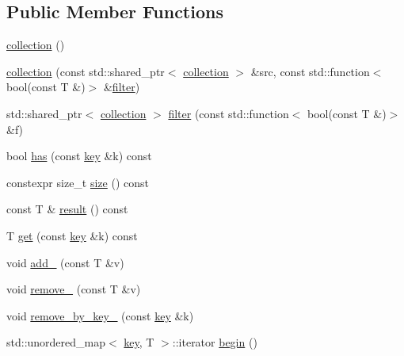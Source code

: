 \subsection*{Public Member Functions}
\begin{DoxyCompactItemize}
\item 
\hyperlink{classtelegraph_1_1collection_a226e589bb9d07937a82843f5da0610a0}{collection} ()
\item 
\hyperlink{classtelegraph_1_1collection_a4ce0e224a982a6025015a1ef7008ca56}{collection} (const std\+::shared\+\_\+ptr$<$ \hyperlink{classtelegraph_1_1collection}{collection} $>$ \&src, const std\+::function$<$ bool(const T \&)$>$ \&\hyperlink{classtelegraph_1_1collection_afa7564c9896fde9d965f422f8ee6a4ce}{filter})
\item 
std\+::shared\+\_\+ptr$<$ \hyperlink{classtelegraph_1_1collection}{collection} $>$ \hyperlink{classtelegraph_1_1collection_afa7564c9896fde9d965f422f8ee6a4ce}{filter} (const std\+::function$<$ bool(const T \&)$>$ \&f)
\item 
bool \hyperlink{classtelegraph_1_1collection_af9b482ee7d179bd7c4dfa47fba1df507}{has} (const \hyperlink{classtelegraph_1_1collection_a7d1c05b1bdcbe95a3127122969e14173}{key} \&k) const
\item 
constexpr size\+\_\+t \hyperlink{classtelegraph_1_1collection_ae51a6f64a8c24e2c602e6c3c4865249a}{size} () const
\item 
const T \& \hyperlink{classtelegraph_1_1collection_ac3c0fd37e9000e9de5ba9c3aeee330c1}{result} () const
\item 
T \hyperlink{classtelegraph_1_1collection_a3065b252176bd28f4280ad0384276e3e}{get} (const \hyperlink{classtelegraph_1_1collection_a7d1c05b1bdcbe95a3127122969e14173}{key} \&k) const
\item 
void \hyperlink{classtelegraph_1_1collection_af8383989a761fdd14631dd6c0e574298}{add\+\_\+} (const T \&v)
\item 
void \hyperlink{classtelegraph_1_1collection_ab736aff469340ac47c12c6b84ac9fd4d}{remove\+\_\+} (const T \&v)
\item 
void \hyperlink{classtelegraph_1_1collection_a0e9199b87fb87d2602fc6e4cc33835c7}{remove\+\_\+by\+\_\+key\+\_\+} (const \hyperlink{classtelegraph_1_1collection_a7d1c05b1bdcbe95a3127122969e14173}{key} \&k)
\item 
std\+::unordered\+\_\+map$<$ \hyperlink{classtelegraph_1_1collection_a7d1c05b1bdcbe95a3127122969e14173}{key}, T $>$\+::iterator \hyperlink{classtelegraph_1_1collection_a0bebe64fbda6ce9af9922531879099c3}{begin} ()

\end{DoxyCompactItemize}
